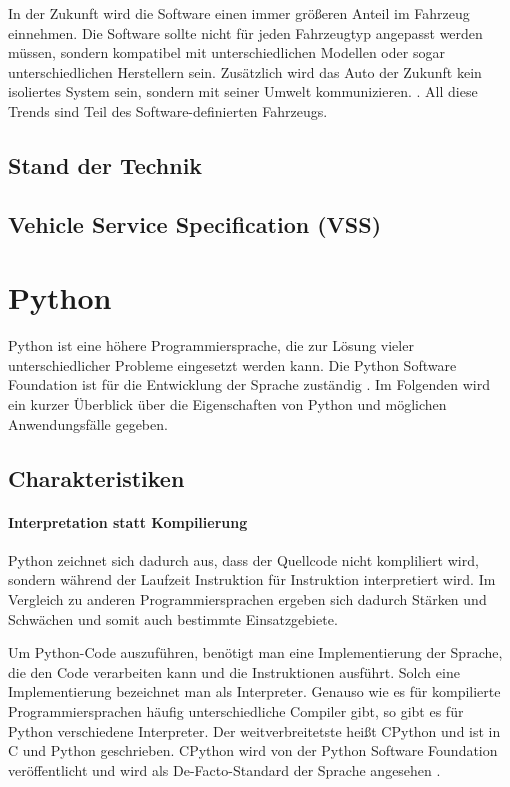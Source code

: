 	In der Zukunft wird die Software einen immer größeren Anteil im Fahrzeug einnehmen. Die Software sollte nicht für jeden Fahrzeugtyp angepasst werden müssen, sondern kompatibel mit unterschiedlichen Modellen oder sogar unterschiedlichen Herstellern sein. Zusätzlich wird das Auto der Zukunft kein isoliertes System sein, sondern mit seiner Umwelt kommunizieren. . All diese Trends sind Teil des Software-definierten Fahrzeugs.
	
	\subsection{Stand der Technik}
	\subsection{Vehicle Service Specification (VSS)}

\section{Python}
	Python ist eine höhere Programmiersprache, die zur Lösung vieler unterschiedlicher Probleme eingesetzt werden kann. Die Python Software Foundation ist für die Entwicklung der Sprache zuständig \cite[vgl.][]{python2022usecases}. Im Folgenden wird ein kurzer Überblick über die Eigenschaften von Python und möglichen Anwendungsfälle gegeben.
	
	\subsection{Charakteristiken} \label{sec:py-characteristics}
		\paragraph{Interpretation statt Kompilierung} Python zeichnet sich dadurch aus, dass der Quellcode nicht kompliliert wird, sondern während der Laufzeit Instruktion für Instruktion interpretiert wird. Im Vergleich zu anderen Programmiersprachen ergeben sich dadurch Stärken und Schwächen und somit auch bestimmte Einsatzgebiete. 
		
		Um Python-Code auszuführen, benötigt man eine Implementierung der Sprache, die den Code verarbeiten kann und die Instruktionen ausführt. Solch eine Implementierung bezeichnet man als Interpreter. Genauso wie es für kompilierte Programmiersprachen häufig unterschiedliche Compiler gibt, so gibt es für Python verschiedene Interpreter. Der weitverbreitetste heißt CPython und ist in C und Python geschrieben. CPython wird von der Python Software Foundation veröffentlicht und wird als De-Facto-Standard der Sprache angesehen \cite[vgl.][S. 25]{python2014brochure} \cite{github2022cpython}.
		
